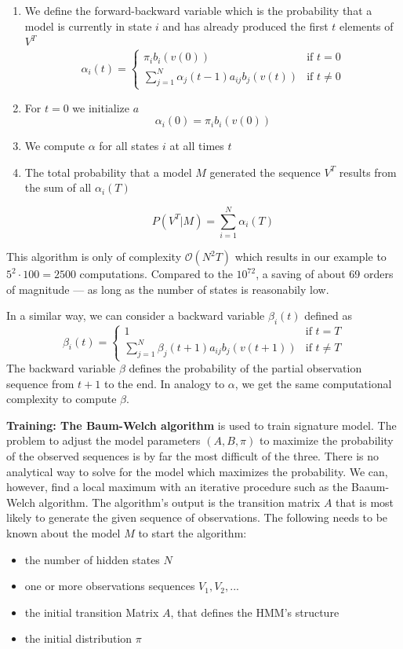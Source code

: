 \documentclass[a4paper, oneside]{csthesis}
\begin{document}
\begin{enumerate}
\item We define the forward-backward variable which is the probability that a model is currently in state $i$ and has already produced the first $t$ elements of $V^T$
$$\alpha_i(t) = \begin{cases} \pi_i b_i(v(0)) & \mbox{if } t = 0 \\ \sum_{j=1}^N \alpha_j(t-1)a_{ij}b_j (v(t))& \mbox{if } t \ne 0 \end{cases}$$

\item For $t=0$ we initialize $a$
$$\alpha_i(0) = \pi_i b_i (v(0))$$

\item We compute $\alpha$ for all states $i$ at all times $t$
\item The total probability that a model $M$ generated the sequence $V^T$ results from the sum of all $\alpha_i(T)$

$$P(V^T|M) = \sum\limits_{i=1}^N \alpha_i(T)$$
\end{enumerate}

This algorithm is only of complexity $\mathcal{O}(N^2T)$ which results in our example to $5^2 \cdot 100 = 2500$ computations. Compared to the $10^72$, a saving of about 69 orders of magnitude --- as long as the number of states is reasonabily low.

In a similar way, we can consider a backward variable $\beta_i(t)$ defined as
$$\beta_i(t) = \begin{cases} 1 & \mbox{if } t = T \\ \sum_{j=1}^N \beta_j(t+1)a_{ij}b_j (v(t+1))& \mbox{if } t \ne T \end{cases}$$
The backward variable $\beta$ defines the probability of the partial observation sequence from $t+1$ to the end. In analogy to $\alpha$, we get the same computational complexity to compute $\beta$.


\textbf{Training: The Baum-Welch algorithm} is used to train signature model. The problem to adjust the model parameters $(A,B, \pi)$ to maximize the probability of the observed sequences is by far the most difficult of the three. There is no analytical way to solve for the model which maximizes the probability. We can, however, find a local maximum with an iterative procedure such as the Baaum-Welch algorithm.
The algorithm's output is the transition matrix $A$ that is most likely to generate the given sequence of observations. The following needs to be known about the model $M$ to start the algorithm:
\begin{itemize}
 \item the number of hidden states $N$
 \item one or more observations sequences $V_1, V_2, ...$
 \item the initial transition Matrix $A$, that defines the HMM's structure
 \item the initial distribution $\pi$
\end{itemize}
\end{document}
